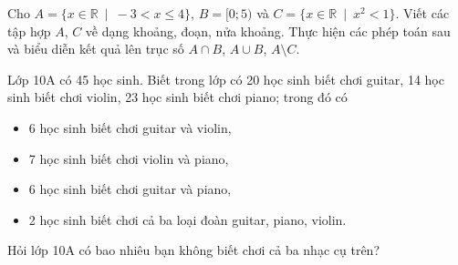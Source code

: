 \TL
\begin{ex}
Cho $A=\{x \in \mathbb{R}\ \mid\ -3<x\le 4 \}$, $B=[0;5)$ và $C=\{x \in \mathbb{R}\ \mid\ x^2<1\}$. Viết các tập hợp $A$, $C$ về dạng khoảng, đoạn, nửa khoảng. Thực hiện các phép toán sau và biểu diễn kết quả lên trục số $A\cap B$, $A\cup B$, $A\setminus C$.
\end{ex}
\begin{ex}
Lớp 10A có 45 học sinh. Biết trong lớp có 20 học sinh biết chơi guitar, 14 học sinh biết chơi violin, 23 học sinh biết chơi piano; trong đó có
\begin{itemize}
    \item 6 học sinh biết chơi guitar và violin,
    \item 7 học sinh biết chơi violin và piano,
    \item 6 học sinh biết chơi guitar và piano,
    \item 2 học sinh biết chơi cả ba loại đoàn guitar, piano, violin.
\end{itemize}
Hỏi lớp 10A có bao nhiêu bạn không biết chơi cả ba nhạc cụ trên?
\end{ex}
